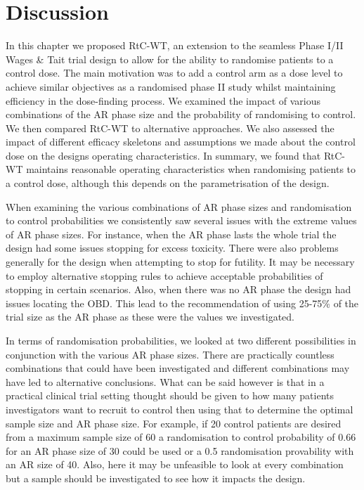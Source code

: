 \section{Discussion}
\label{WT:Discussion}

In this chapter we proposed RtC-WT, an extension to the seamless Phase \RN{1}/\RN{2} Wages \& Tait trial design to allow for the ability to randomise patients to a control dose. The main motivation was to add a control arm as a dose level to achieve similar objectives as a randomised phase \RN{2} study whilst maintaining efficiency in the dose-finding process. We examined the impact of various combinations of the AR phase size and the probability of randomising to control. We then compared RtC-WT to alternative approaches. We also assessed the impact of different efficacy skeletons and assumptions we made about the control dose on the designs operating characteristics. In summary, we found that RtC-WT maintains reasonable operating characteristics when randomising patients to a control dose, although this depends on the parametrisation of the design.   

When examining the various combinations of AR phase sizes and randomisation to control probabilities we consistently saw several issues with the extreme values of AR phase sizes. For instance, when the AR phase lasts the whole trial the design had some issues stopping for excess toxicity. There were also problems generally for the design when attempting to stop for futility. It may be necessary to employ alternative stopping rules to achieve acceptable probabilities of stopping in certain scenarios. Also, when there was no AR phase the design had issues locating the OBD. This lead to the recommendation of using 25-75\% of the trial size as the AR phase as these were the values we investigated. 

In terms of randomisation probabilities, we looked at two different possibilities in conjunction with the various AR phase sizes. There are practically countless combinations that could have been investigated and different combinations may have led to alternative conclusions. What can be said however is that in a practical clinical trial setting thought should be given to how many patients investigators want to recruit to control then using that to determine the optimal sample size and AR phase size. For example, if 20 control patients are desired from a maximum sample size of 60 a randomisation to control probability of 0.66 for an AR phase size of 30 could be used or a 0.5 randomisation provability with an AR size of 40. Also, here it may be unfeasible to look at every combination but a sample should be investigated to see how it impacts the design. 

